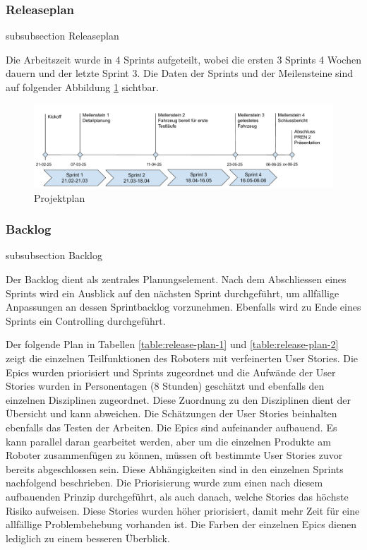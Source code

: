 \subsubsection*{Releaseplan}
    {subsubsection}
    {Releaseplan}

Die Arbeitszeit wurde in 4 Sprints aufgeteilt, wobei die ersten 3 Sprints 4 Wochen dauern und der letzte Sprint 3. Die Daten der Sprints und der Meilensteine sind auf folgender Abbildung \ref{fig:project-plan} sichtbar.


\begin{figure}[H]
\centering
\includegraphics[width=\textwidth]{assets/projektmanagement/projektplan.pdf}
\caption{Projektplan}
\label{fig:project-plan}
\end{figure}

\subsubsection*{Backlog}
    {subsubsection}
    {Backlog}
    
Der Backlog dient als zentrales Planungselement.
Nach dem Abschliessen eines Sprints wird ein Ausblick auf den nächsten Sprint durchgeführt, um allfällige Anpassungen an dessen Sprintbacklog vorzunehmen. Ebenfalls wird zu Ende eines Sprints ein Controlling durchgeführt.

Der folgende Plan in Tabellen \ref{table:release-plan-1} und \ref{table:release-plan-2} zeigt die einzelnen Teilfunktionen des Roboters mit verfeinerten User Stories. Die Epics wurden priorisiert und Sprints zugeordnet und die Aufwände der User Stories wurden in Personentagen (8 Stunden) geschätzt und ebenfalls den einzelnen Disziplinen zugeordnet. Diese Zuordnung zu den Disziplinen dient der Übersicht und kann abweichen.
Die Schätzungen der User Stories beinhalten ebenfalls das Testen der Arbeiten. Die Epics sind aufeinander aufbauend. Es kann parallel daran gearbeitet werden, aber um die einzelnen Produkte am Roboter zusammenfügen zu können, müssen oft bestimmte User Stories zuvor bereits abgeschlossen sein. Diese Abhängigkeiten sind in den einzelnen Sprints nachfolgend beschrieben. Die Priorisierung wurde zum einen nach diesem aufbauenden Prinzip durchgeführt, als auch danach, welche Stories das höchste Risiko aufweisen. Diese Stories wurden höher priorisiert, damit mehr Zeit für eine allfällige Problembehebung vorhanden ist.
Die Farben der einzelnen Epics dienen lediglich zu einem besseren Überblick.


